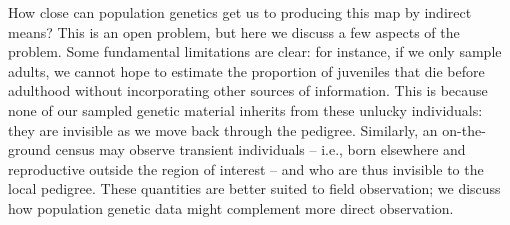 \documentclass{ar-1col}
\begin{document}
How close can population genetics get us to producing this map by indirect means?
This is an open problem,
but here we discuss a few aspects of the problem.
Some fundamental limitations are clear:
for instance, 
if we only sample adults,
we cannot hope to estimate the proportion of juveniles that die before adulthood
without incorporating other sources of information.
This is because none of our sampled genetic material inherits from these unlucky individuals:
they are invisible as we move back through the pedigree.
Similarly, an on-the-ground census may observe transient individuals
-- i.e., born elsewhere and reproductive outside the region of interest --
and who are thus invisible to the local pedigree.
These quantities are better suited to field observation;
we discuss how population genetic data might complement more direct observation.


\end{document}

